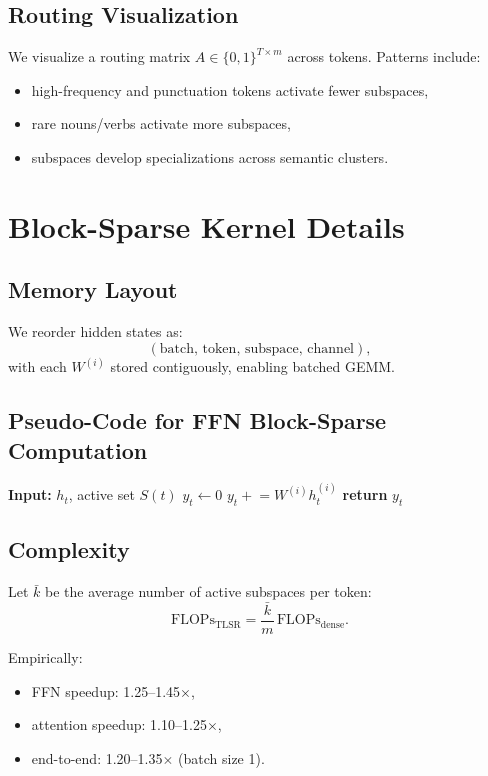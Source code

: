 \documentclass{article}
\theoremstyle{plain}
\theoremstyle{definition}
\theoremstyle{remark}
\begin{document}
\subsection{Routing Visualization}
We visualize a routing matrix $A\in\{0,1\}^{T\times m}$ across tokens.
Patterns include:
\begin{itemize}
\item high-frequency and punctuation tokens activate fewer subspaces,
\item rare nouns/verbs activate more subspaces,
\item subspaces develop specializations across semantic clusters.
\end{itemize}

\section{Block-Sparse Kernel Details}

\subsection{Memory Layout}
We reorder hidden states as:
\[
(\text{batch},\,\text{token},\,\text{subspace},\,\text{channel}),
\]
with each $W^{(i)}$ stored contiguously, enabling batched GEMM.

\subsection{Pseudo-Code for FFN Block-Sparse Computation}

\begin{algorithm}[h]
\caption{Block-sparse FFN}
\begin{algorithmic}[1]
\STATE \textbf{Input:} $h_t$, active set $S(t)$
\STATE $y_t \gets 0$
  \STATE $y_t \mathrel{+}= W^{(i)} h_t^{(i)}$
\ENDFOR
\STATE \textbf{return} $y_t$
\end{algorithmic}
\end{algorithm}

\subsection{Complexity}
Let $\bar{k}$ be the average number of active subspaces per token:
\[
\mathrm{FLOPs}_{\mathrm{TLSR}}
=
\frac{\bar{k}}{m}\,
\mathrm{FLOPs}_{\mathrm{dense}}.
\]

Empirically:
\begin{itemize}
\item FFN speedup: 1.25–1.45$\times$,
\item attention speedup: 1.10–1.25$\times$,
\item end-to-end: 1.20–1.35$\times$ (batch size 1).
\end{itemize}
\end{document}
